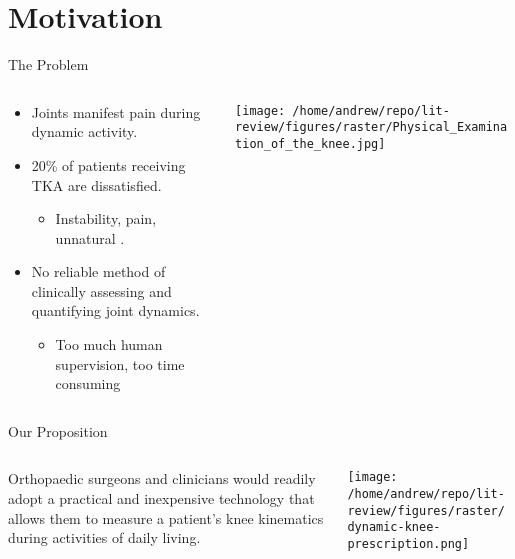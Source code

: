 \documentclass[aspectratio=1610]{beamer}
\begin{document}
\section{Motivation}
\label{sec:org229fbd8}
\begin{frame}[label={sec:org316163a}]{The Problem}
\begin{columns}
\begin{column}{0.5\columnwidth}
\begin{itemize}
\item Joints manifest pain during dynamic activity.
\item 20\% of patients receiving TKA are dissatisfied.
\begin{itemize}
\item Instability, pain, unnatural \autocites{bakerRolePainFunction2007}[][]{bournePatientSatisfactionTotal2010}[][]{scottPredictingDissatisfactionFollowing2010}.
\end{itemize}
\item No reliable method of clinically assessing and quantifying joint dynamics.
\begin{itemize}
\item Too much human supervision, too time consuming
\end{itemize}
\end{itemize}
\end{column}
\begin{column}{0.5\columnwidth}
\begin{center}
\texttt{[image: /home/andrew/repo/lit-review/figures/raster/Physical\_Examination\_of\_the\_knee.jpg]}
\end{center}
\end{column}
\end{columns}
\end{frame}
\begin{frame}[label={sec:orgabccdce}]{Our Proposition}
\begin{columns}
\begin{column}{0.5\columnwidth}
Orthopaedic surgeons and clinicians would readily adopt a practical and inexpensive technology that allows them to measure a patient's knee kinematics during activities of daily living.
\end{column}
\begin{column}{0.55\columnwidth}
\begin{center}
\texttt{[image: /home/andrew/repo/lit-review/figures/raster/dynamic-knee-prescription.png]}
\end{center}
\end{column}
\end{columns}
\end{frame}
\end{document}

